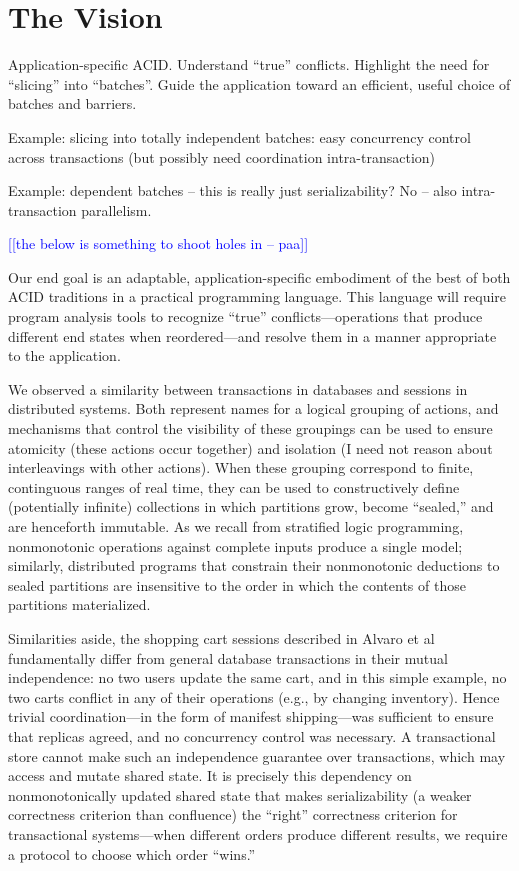 \documentclass{sig-alternate}
\newcommand{\paa}[1]{{\textcolor{blue}{[[#1 -- paa]]}}}
\begin{document}
\section{The Vision}
Application-specific ACID.  Understand ``true'' conflicts.  Highlight the need
for ``slicing'' into ``batches''.  Guide the application toward an efficient,
useful choice of batches and barriers.

Example: slicing into totally independent batches: easy concurrency control
across transactions (but possibly need coordination intra-transaction)

Example: dependent batches -- this is really just serializability?  No -- also
intra-transaction parallelism.

\paa{the below is something to shoot holes in}

Our end goal is an adaptable, application-specific embodiment of the best of both ACID traditions in a practical programming language. This language will require program analysis tools to recognize ``true'' conflicts---operations that produce different end states when reordered---and resolve them in a manner appropriate to the application.

We observed a similarity between transactions in databases and sessions in distributed systems.  Both represent names for a logical grouping of actions, and mechanisms that control the visibility of these groupings can be used to ensure atomicity (these actions occur together) and isolation (I need not reason about interleavings with other actions).  When these grouping correspond to finite, continguous ranges of real time, they can be used to constructively define (potentially infinite) collections in which partitions grow, become ``sealed,'' and are henceforth immutable.  As we recall from stratified logic programming, nonmonotonic operations against complete inputs produce a single model; similarly, distributed programs that constrain their nonmonotonic deductions to sealed partitions are insensitive to the order in which the contents of those partitions materialized.
 
Similarities aside, the shopping cart sessions described in Alvaro et al fundamentally differ from general database transactions in their mutual independence: no two users update the same cart, and in this simple example, no two carts conflict in any of their operations (e.g., by changing inventory).  Hence trivial coordination---in the form of manifest shipping---was sufficient to ensure that replicas agreed, and no concurrency control was necessary.  A transactional store cannot make such an independence guarantee over transactions, which may access and mutate shared state.   It is precisely this dependency on nonmonotonically updated shared state that makes serializability (a weaker correctness criterion than confluence) the ``right'' correctness criterion for transactional systems---when different orders produce different results, we require a protocol to choose which order ``wins.'' 
\end{document}
